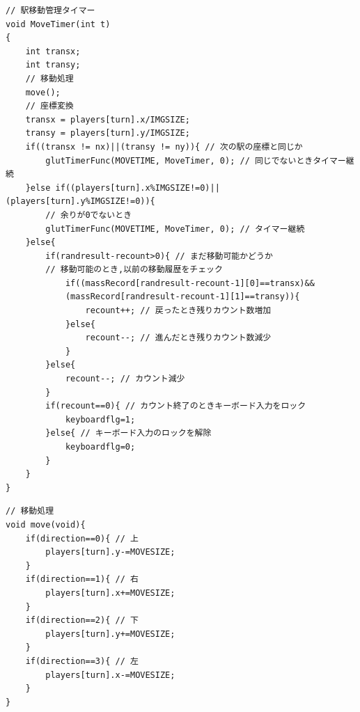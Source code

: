 \documentclass[a4j]{jarticle}
\begin{document}
    \begin{lstlisting}[basicstyle=\ttfamily\footnotesize, frame=single,label=MoveTimer,caption=MoveTimer関数]
// 駅移動管理タイマー
void MoveTimer(int t)
{
    int transx;
    int transy;
    // 移動処理
    move();
    // 座標変換
    transx = players[turn].x/IMGSIZE;
    transy = players[turn].y/IMGSIZE;
    if((transx != nx)||(transy != ny)){ // 次の駅の座標と同じか
        glutTimerFunc(MOVETIME, MoveTimer, 0); // 同じでないときタイマー継続
    }else if((players[turn].x%IMGSIZE!=0)||(players[turn].y%IMGSIZE!=0)){  
        // 余りが0でないとき
        glutTimerFunc(MOVETIME, MoveTimer, 0); // タイマー継続
    }else{
        if(randresult-recount>0){ // まだ移動可能かどうか
        // 移動可能のとき,以前の移動履歴をチェック
            if((massRecord[randresult-recount-1][0]==transx)&&
            (massRecord[randresult-recount-1][1]==transy)){
                recount++; // 戻ったとき残りカウント数増加
            }else{
                recount--; // 進んだとき残りカウント数減少
            }
        }else{
            recount--; // カウント減少
        }
        if(recount==0){ // カウント終了のときキーボード入力をロック
            keyboardflg=1;
        }else{ // キーボード入力のロックを解除
            keyboardflg=0;
        }
    }
}
    \end{lstlisting}  

    \begin{lstlisting}[basicstyle=\ttfamily\footnotesize, frame=single,label=move,caption=move関数]
// 移動処理
void move(void){
    if(direction==0){ // 上
        players[turn].y-=MOVESIZE;
    }
    if(direction==1){ // 右
        players[turn].x+=MOVESIZE;
    }
    if(direction==2){ // 下
        players[turn].y+=MOVESIZE;
    }
    if(direction==3){ // 左
        players[turn].x-=MOVESIZE;
    }
}
    \end{lstlisting} 
\end{document}

